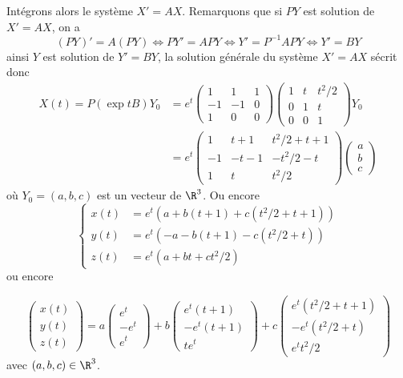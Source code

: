 {\begin{enumerate}
{Int\'egrons alors le syst\`eme $X'=AX$. Remarquons que si $PY$ est solution de $X'=AX$, on a 
$$(PY)'=A(PY)\iff PY'=APY\iff Y'=P^{-1}APY\iff Y'=BY$$
ainsi $Y$ est solution de $Y'=BY$, la solution g\'en\'erale du syst\`eme $X'=AX$ s\'ecrit donc
$$\begin{aligned}X(t)=P(\exp tB)Y_0&=e^t\begin{pmatrix}1& 1 &1 \\  -1&-1&0 \\ 1&0&0\end{pmatrix}\begin{pmatrix}1&t&t^2/2 \\ 0&1&t \\ 0&0&1\end{pmatrix}Y_0 \\  &=e^t
\begin{pmatrix}1& t+1& t^2/2+t+1 \\  -1&-t-1&-t^2/2-t \\  1&t&t^2/2\end{pmatrix}\begin{pmatrix}a \\  b \\  c\end{pmatrix}\end{aligned}$$
o\`u $Y_0=(a,b,c)$ est un vecteur de $\R^3$. Ou encore
$$\left\{\begin{aligned}
x(t)&=e^t(a+b(t+1)+c(t^2/2+t+1)) \\  y(t)&=e^t(-a-b(t+1)-c(t^2/2+t)) \\  z(t)&=e^t(a+bt+ct^2/2)
\end{aligned}\right.$$ ou encore

$$\begin{pmatrix}x(t) \\  y(t) \\  z(t)\end{pmatrix}=a\begin{pmatrix}e^t \\  -e^t \\  e^t\end{pmatrix}+
b\begin{pmatrix}e^t(t+1) \\  -e^t(t+1) \\  te^t\end{pmatrix}+c\begin{pmatrix}e^t(t^2/2+t+1) \\  -e^t(t^2/2+t) \\  e^t t^2/2\end{pmatrix}$$
avec $(a,b,c)\in\R^3$.}
\end{enumerate}
}
